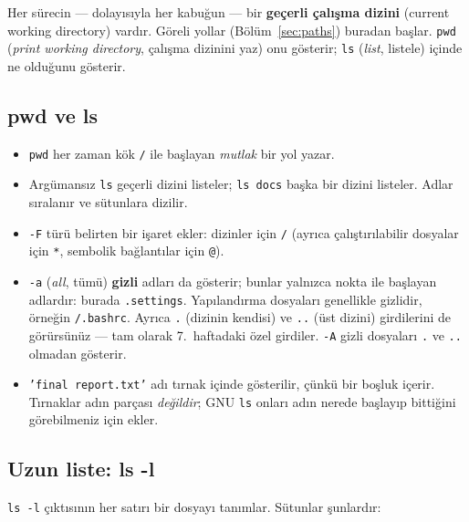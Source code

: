 \documentclass[11pt,a4paper]{article}
\newcommand{\term}[1]{\textbf{\color{mintdeep}#1}}
\newcommand{\cmd}[1]{\texttt{#1}}
\begin{document}
Her sürecin --- dolayısıyla her kabuğun --- bir \term{geçerli çalışma dizini} (current working directory) vardır. Göreli yollar (Bölüm~\ref{sec:paths}) buradan başlar. \cmd{pwd} (\emph{print working directory}, çalışma dizinini yaz) onu gösterir; \cmd{ls} (\emph{list}, listele) içinde ne olduğunu gösterir.

\subsection{pwd ve ls}


\begin{itemize}
  \item \cmd{pwd} her zaman kök \texttt{/} ile başlayan \emph{mutlak} bir yol yazar.
  \item Argümansız \cmd{ls} geçerli dizini listeler; \cmd{ls docs} başka bir dizini listeler. Adlar sıralanır ve sütunlara dizilir.
  \item \cmd{-F} türü belirten bir işaret ekler: dizinler için \texttt{/} (ayrıca çalıştırılabilir dosyalar için \texttt{*}, sembolik bağlantılar için \texttt{@}).
  \item \cmd{-a} (\emph{all}, tümü) \term{gizli} adları da gösterir; bunlar yalnızca nokta ile başlayan adlardır: burada \texttt{.settings}. Yapılandırma dosyaları genellikle gizlidir, örneğin \texttt{\tl/.bashrc}. Ayrıca \texttt{.} (dizinin kendisi) ve \texttt{..} (üst dizini) girdilerini de görürsünüz --- tam olarak 7.\ haftadaki özel girdiler. \cmd{-A} gizli dosyaları \texttt{.} ve \texttt{..} olmadan gösterir.
  \item \texttt{'final report.txt'} adı tırnak içinde gösterilir, çünkü bir boşluk içerir. Tırnaklar adın parçası \emph{değildir}; GNU \cmd{ls} onları adın nerede başlayıp bittiğini görebilmeniz için ekler.
\end{itemize}

\subsection{Uzun liste: ls -l}


\cmd{ls -l} çıktısının her satırı bir dosyayı tanımlar. Sütunlar şunlardır:
\end{document}

